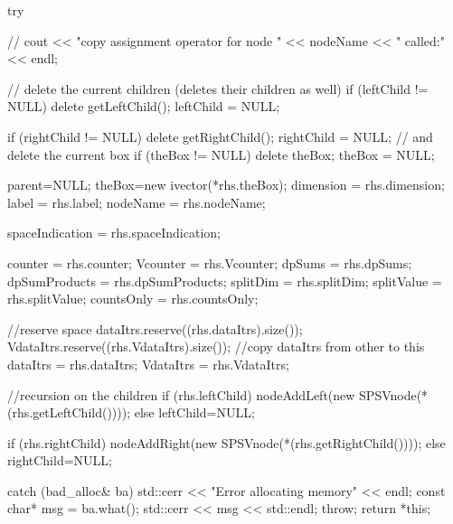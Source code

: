 \begin{DoxyCode}
    {
        try {

          //  cout << "copy assignment operator for node " << nodeName << "
       called:" << endl;
     
            // delete the current children (deletes their children as well)
            if (leftChild != NULL) {
                delete getLeftChild();
                leftChild = NULL;
            }

            if (rightChild != NULL) {
                delete getRightChild();
                rightChild = NULL;
            }
            // and delete the current box
            if (theBox != NULL) {
                delete theBox;
                theBox = NULL;
            }

            parent=NULL;
            theBox=new ivector(*rhs.theBox);
            dimension = rhs.dimension;
            label = rhs.label;
            nodeName = rhs.nodeName;

            spaceIndication = rhs.spaceIndication;

            counter = rhs.counter;
            Vcounter = rhs.Vcounter;
            dpSums = rhs.dpSums;
            dpSumProducts = rhs.dpSumProducts;
            splitDim = rhs.splitDim;
            splitValue = rhs.splitValue;
            countsOnly = rhs.countsOnly;

            //reserve space
            dataItrs.reserve((rhs.dataItrs).size());
            VdataItrs.reserve((rhs.VdataItrs).size());
            //copy dataItrs from other to this
            dataItrs = rhs.dataItrs;
        VdataItrs = rhs.VdataItrs;
        
            //recursion on the children
            if (rhs.leftChild) {
                nodeAddLeft(new SPSVnode(*(rhs.getLeftChild())));
            }
            else leftChild=NULL;

            if (rhs.rightChild) {
                nodeAddRight(new SPSVnode(*(rhs.getRightChild())));
            }
            else rightChild=NULL;
        }
        catch (bad_alloc& ba) {
            std::cerr << "Error allocating memory" << endl;
            const char* msg = ba.what();
            std::cerr << msg << std::endl;
            throw;
        }
        return *this;
    }
\end{DoxyCode}
